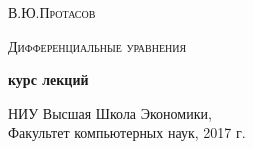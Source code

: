\documentclass[12pt,a4paper]{article}
\date{}
\begin{document}
\begin{titlepage}

\vspace{2cm}


\begin{center}
{\textsc{В.Ю.Протасов}}
\end{center}
\vspace{1cm}

\begin{center}
\Large{\textsc{Дифференциальные уравнения}}
\end{center}
\vspace{1cm}

\begin{center}
\textbf{курс лекций} \\
\vspace{1cm}

НИУ Высшая Школа Экономики, \\
Факультет компьютерных наук, 2017 г. \\
\end{center}

\bigskip
 \end{titlepage}
\newpage
\end{document}
